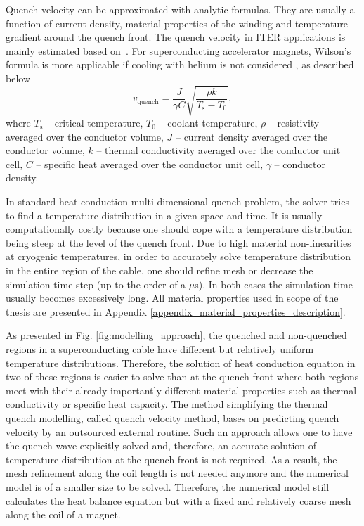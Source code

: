 \documentclass{article}
\begin{document}
Quench velocity can be approximated with analytic formulas. They are usually a function of current density, material properties of the winding and temperature gradient around the quench front. The quench velocity in ITER applications is mainly estimated based on~\cite{MIT_phd_thesis}. For superconducting accelerator magnets, Wilson's formula is more applicable if cooling with helium is not considered \cite[p.~206]{wilson1987superconducting}, as described below
\begin{equation}
    v_\text{quench}=\frac{J}{\gamma C}\sqrt{\frac{\rho k}{T_\text{s}-T_\text{0}}},
    \label{eqn:Wilson_quench_velocity_formula}
\end{equation}
where $T_\text{s}$ -- critical temperature,
$T_\text{0}$ -- coolant temperature,
$\rho$ -- resistivity averaged over the conductor volume,
$J$ -- current density averaged over the conductor volume,
$k$ -- thermal conductivity averaged over the conductor unit cell,
$C$ -- specific heat averaged over the conductor unit cell,
$\gamma$ -- conductor density.

In standard heat conduction multi-dimensional quench problem, the solver tries to find a temperature distribution in a given space and time. It is usually computationally costly because one should cope with a temperature distribution being steep at the level of the quench front. Due to high material non-linearities at cryogenic temperatures, in order to accurately solve temperature distribution in the entire region of the cable, one should refine mesh or decrease the simulation time step (up to the order of a $\mu$s). In both cases the simulation time usually becomes excessively long. All material properties used in scope of the thesis are presented in Appendix \ref{appendix_material_properties_description}.

As presented in Fig. \ref{fig:modelling_approach}, the quenched and non-quenched regions in a superconducting cable have different but relatively uniform temperature distributions. Therefore, the solution of heat conduction equation in two of these regions is easier to solve than at the quench front where both regions meet with their already importantly different material properties such as thermal conductivity or specific heat capacity. The method simplifying the thermal quench modelling, called quench velocity method, bases on predicting quench velocity by an outsourced external routine. Such an approach allows one to have the quench wave explicitly solved and, therefore, an accurate solution of temperature distribution at the quench front is not required. As a result, the mesh refinement along the coil length is not needed anymore and the numerical model is of a smaller size to be solved. Therefore, the numerical model still calculates the heat balance equation but with a fixed and relatively coarse mesh along the coil of a magnet. 
 
\end{document}
